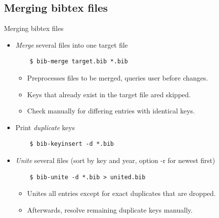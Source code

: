 \documentclass[xcolor={table,dvipsnames}]{beamer}
\renewcommand{\emph}[1]{\textit{\color{orange!90!brown}#1}}
\begin{document}
\subsection{Merging bibtex files}
\begin{frame}[fragile]{Merging bibtex files}
  \begin{itemize}

    \item \emph{Merge} several files into one target file
      \begin{lstlisting}
	$ bib-merge target.bib *.bib
      \end{lstlisting}

      \begin{itemize}
	\item Preprocesses files to be merged, queries user before changes.
	\item Keys that already exist in the target file ared skipped.
	\item Check manually for differing entries with identical keys.
      \end{itemize}

    \item Print \emph{duplicate} keys
      \begin{lstlisting}
	$ bib-keyinsert -d *.bib
      \end{lstlisting}

    \item \emph{Unite} several files
      {\color{gray}(sort by key and year, option -r for newest first)}
      \begin{lstlisting}
	$ bib-unite -d *.bib > united.bib
      \end{lstlisting}

      \begin{itemize}
	\item Unites all entries except for exact duplicates that are dropped.
	\item Afterwards, resolve remaining duplicate keys manually.
      \end{itemize}

  \end{itemize}
\end{frame}
\end{document}
